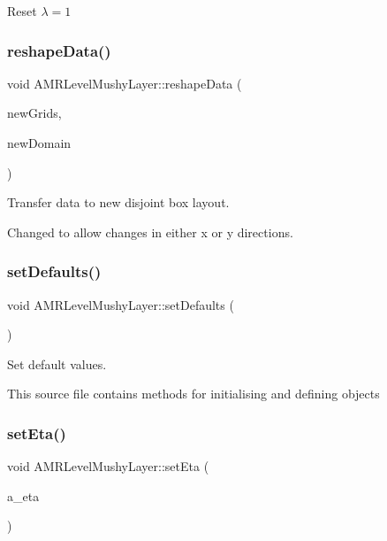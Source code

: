 Reset $ \lambda = 1$ \mbox{\label{class_a_m_r_level_mushy_layer_a8032590f0d7a8160dc1a56151648f7c8}} 
\subsubsection{\texorpdfstring{reshape\+Data()}{reshapeData()}}
{\footnotesize\ttfamily void A\+M\+R\+Level\+Mushy\+Layer\+::reshape\+Data (\begin{DoxyParamCaption}\item[{\textbf{ Disjoint\+Box\+Layout}}]{new\+Grids,  }\item[{\textbf{ Problem\+Domain}}]{new\+Domain }\end{DoxyParamCaption})}



Transfer data to new disjoint box layout. 

Changed to allow changes in either x or y directions. \mbox{\label{class_a_m_r_level_mushy_layer_ad9766575f35a8fc27568ad7dde975eec}} 
\subsubsection{\texorpdfstring{set\+Defaults()}{setDefaults()}}
{\footnotesize\ttfamily void A\+M\+R\+Level\+Mushy\+Layer\+::set\+Defaults (\begin{DoxyParamCaption}{ }\end{DoxyParamCaption})}



Set default values. 

This source file contains methods for initialising and defining objects \mbox{\label{class_a_m_r_level_mushy_layer_a5064704173348a8efa158f400983a101}} 
\subsubsection{\texorpdfstring{set\+Eta()}{setEta()}}
{\footnotesize\ttfamily void A\+M\+R\+Level\+Mushy\+Layer\+::set\+Eta (\begin{DoxyParamCaption}\item[{\textbf{ Real}}]{a\+\_\+eta }\end{DoxyParamCaption})}



